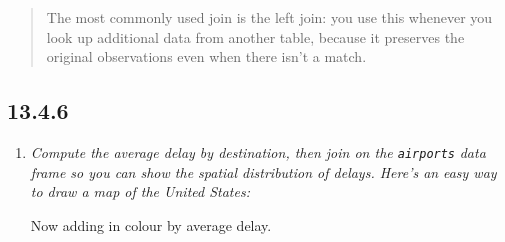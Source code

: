 \documentclass[]{book}
\newenvironment{Shaded}{\begin{snugshade}}{\end{snugshade}}
\newcommand{\KeywordTok}[1]{\textcolor[rgb]{0.13,0.29,0.53}{\textbf{#1}}}
\newcommand{\NormalTok}[1]{#1}
\newcommand{\OperatorTok}[1]{\textcolor[rgb]{0.81,0.36,0.00}{\textbf{#1}}}
\newcommand{\StringTok}[1]{\textcolor[rgb]{0.31,0.60,0.02}{#1}}
\theoremstyle{definition}
\theoremstyle{definition}
\theoremstyle{definition}
\theoremstyle{remark}
\begin{document}
\begin{quote}
The most commonly used join is the left join: you use this whenever you
look up additional data from another table, because it preserves the
original observations even when there isn't a match.
\end{quote}

\hypertarget{section-38}{%
\subsection{13.4.6}\label{section-38}}

\begin{enumerate}
\def\labelenumi{\arabic{enumi}.}
\item
  \emph{Compute the average delay by destination, then join on the
  \texttt{airports}} \emph{data frame so you can show the spatial
  distribution of delays. Here's an} \emph{easy way to draw a map of the
  United States:}

\begin{Shaded}
\end{Shaded}

  Now adding in colour by average delay.


\end{enumerate}
\end{document}
